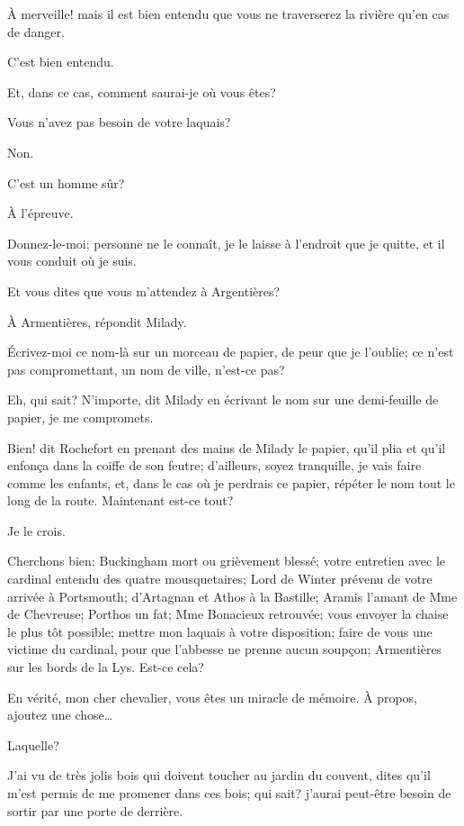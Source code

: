 \speak  À merveille! mais il est bien entendu que vous ne traverserez la rivière qu'en cas de danger. 

\speak  C'est bien entendu. 

\speak  Et, dans ce cas, comment saurai-je où vous êtes? 

\speak  Vous n'avez pas besoin de votre laquais? 

\speak  Non. 

\speak  C'est un homme sûr? 

\speak  À l'épreuve. 

\speak  Donnez-le-moi; personne ne le connaît, je le laisse à l'endroit que je quitte, et il vous conduit où je suis. 

\speak  Et vous dites que vous m'attendez à Argentières? 

\speak  À Armentières, répondit Milady. 

\speak  Écrivez-moi ce nom-là sur un morceau de papier, de peur que je l'oublie; ce n'est pas compromettant, un nom de ville, n'est-ce pas? 

\speak  Eh, qui sait? N'importe, dit Milady en écrivant le nom sur une demi-feuille de papier, je me compromets. 

\speak  Bien! dit Rochefort en prenant des mains de Milady le papier, qu'il plia et qu'il enfonça dans la coiffe de son feutre; d'ailleurs, soyez tranquille, je vais faire comme les enfants, et, dans le cas où je perdrais ce papier, répéter le nom tout le long de la route. Maintenant est-ce tout? 

\speak  Je le crois. 

\speak  Cherchons bien: Buckingham mort ou grièvement blessé; votre entretien avec le cardinal entendu des quatre mousquetaires; Lord de Winter prévenu de votre arrivée à Portsmouth; d'Artagnan et Athos à la Bastille; Aramis l'amant de Mme de Chevreuse; Porthos un fat; Mme Bonacieux retrouvée; vous envoyer la chaise le plus tôt possible; mettre mon laquais à votre disposition; faire de vous une victime du cardinal, pour que l'abbesse ne prenne aucun soupçon; Armentières sur les bords de la Lys. Est-ce cela? 

\speak  En vérité, mon cher chevalier, vous êtes un miracle de mémoire. À propos, ajoutez une chose\dots 

\speak  Laquelle? 

\speak  J'ai vu de très jolis bois qui doivent toucher au jardin du couvent, dites qu'il m'est permis de me promener dans ces bois; qui sait? j'aurai peut-être besoin de sortir par une porte de derrière. 

